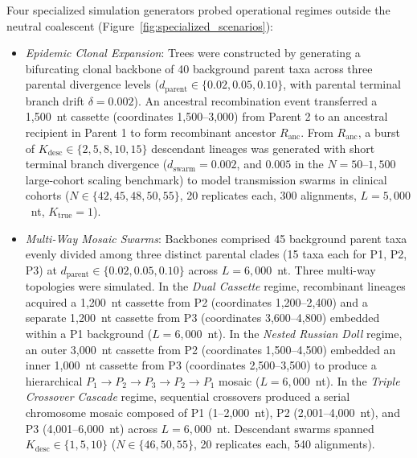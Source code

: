 Four specialized simulation generators probed operational regimes outside the neutral coalescent (Figure~\ref{fig:specialized_scenarios}):
\begin{itemize}
    \item \emph{Epidemic Clonal Expansion}: Trees were constructed by generating a bifurcating clonal backbone of 40 background parent taxa across three parental divergence levels ($d_{\mathrm{parent}} \in \{0.02, 0.05, 0.10\}$, with parental terminal branch drift $\delta = 0.002$). An ancestral recombination event transferred a 1,500~nt cassette (coordinates 1,500--3,000) from Parent 2 to an ancestral recipient in Parent 1 to form recombinant ancestor $R_{\mathrm{anc}}$. From $R_{\mathrm{anc}}$, a burst of $K_{\mathrm{desc}} \in \{2, 5, 8, 10, 15\}$ descendant lineages was generated with short terminal branch divergence ($d_{\mathrm{swarm}} = 0.002$, and $0.005$ in the $N = 50\text{--}1{,}500$ large-cohort scaling benchmark) to model transmission swarms in clinical cohorts ($N \in \{42, 45, 48, 50, 55\}$, 20 replicates each, 300 alignments, $L = 5{,}000$~nt, $K_{\mathrm{true}} = 1$).
    
    \item \emph{Multi-Way Mosaic Swarms}: Backbones comprised 45 background parent taxa evenly divided among three distinct parental clades (15 taxa each for P1, P2, P3) at $d_{\mathrm{parent}} \in \{0.02, 0.05, 0.10\}$ across $L = 6{,}000$~nt. Three multi-way topologies were simulated.
    In the \emph{Dual Cassette} regime, recombinant lineages acquired a 1,200~nt cassette from P2 (coordinates 1,200--2,400) and a separate 1,200~nt cassette from P3 (coordinates 3,600--4,800) embedded within a P1 background ($L=6{,}000$~nt).
    In the \emph{Nested Russian Doll} regime, an outer 3,000~nt cassette from P2 (coordinates 1,500--4,500) embedded an inner 1,000~nt cassette from P3 (coordinates 2,500--3,500) to produce a hierarchical $P_1 \to P_2 \to P_3 \to P_2 \to P_1$ mosaic ($L=6{,}000$~nt).
    In the \emph{Triple Crossover Cascade} regime, sequential crossovers produced a serial chromosome mosaic composed of P1 (1--2,000~nt), P2 (2,001--4,000~nt), and P3 (4,001--6,000~nt) across $L=6{,}000$~nt. Descendant swarms spanned $K_{\mathrm{desc}} \in \{1, 5, 10\}$ ($N \in \{46, 50, 55\}$, 20 replicates each, 540 alignments).
    

\end{itemize}
